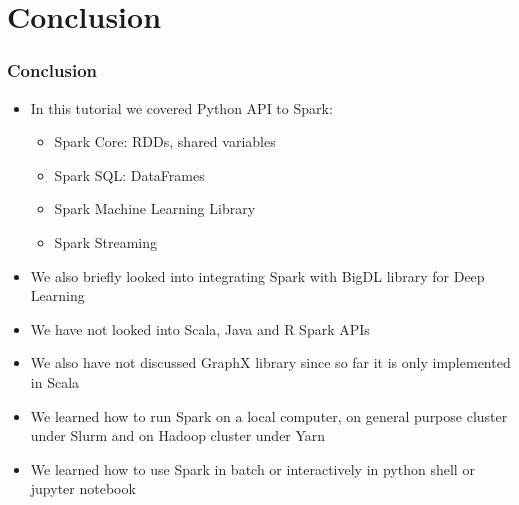\section{Conclusion}
\begin{frame}[fragile]
  \frametitle{Conclusion}
  \begin{itemize}
  \item In this tutorial we covered Python API to Spark:
    \begin{itemize}
    \item Spark Core: RDDs, shared variables
    \item Spark SQL: DataFrames
    \item Spark Machine Learning Library
    \item Spark Streaming
    \end{itemize}
  \item We also briefly looked into integrating Spark with BigDL library for Deep Learning
  \item We have not looked into Scala, Java and R Spark APIs
  \item We also have not discussed GraphX library since so far it is only implemented in Scala
  \item We learned how to run Spark on a local computer, on general purpose cluster under Slurm and on Hadoop cluster under Yarn
  \item We learned how to use Spark in batch or interactively in python shell or jupyter notebook
  \end{itemize}
\end{frame}